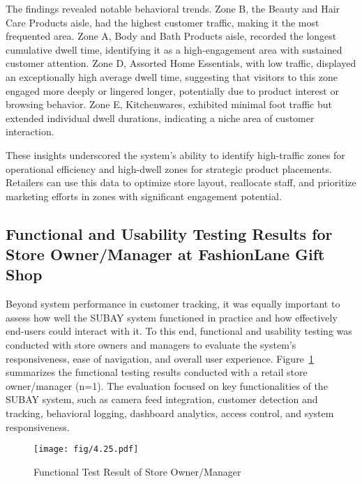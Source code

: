 {{\begin{longtable}{|p{1.5cm}|p{1.5cm}|c|p{1.5cm}|p{1.5cm}|p{1.5cm}|p{1.5cm}|}
	\end{longtable}
}


The findings revealed notable behavioral trends. Zone B, the Beauty and Hair Care Products aisle, had the highest customer traffic, making it the most frequented area. Zone A, Body and Bath Products aisle, recorded the longest cumulative dwell time, identifying it as a high-engagement area with sustained customer attention. Zone D, Assorted Home Essentials, with low traffic, displayed an exceptionally high average dwell time, suggesting that visitors to this zone engaged more deeply or lingered longer, potentially due to product interest or browsing behavior. Zone E, Kitchenwares, exhibited minimal foot traffic but extended individual dwell durations, indicating a niche area of customer interaction.

These insights underscored the system’s ability to identify high-traffic zones for operational efficiency and high-dwell zones for strategic product placements. Retailers can use this data to optimize store layout, reallocate staff, and prioritize marketing efforts in zones with significant engagement potential.

\subsection{Functional and Usability Testing Results for Store Owner/\newline Manager at FashionLane Gift Shop}

Beyond system performance in customer tracking, it was equally important to assess how well the SUBAY system functioned in practice and how effectively end-users could interact with it. To this end, functional and usability testing was conducted with store owners and managers to evaluate the system’s responsiveness, ease of navigation, and overall user experience. Figure~\ref{fig:4.25} summarizes the functional testing results conducted with a retail store owner/manager (n=1). The evaluation focused on key functionalities of the SUBAY system, such as camera feed integration, customer detection and tracking, behavioral logging, dashboard analytics, access control, and system responsiveness.

\begin{figure}[H]
	\caption[Functional Test Result of Store Owner/Manager]{\newline \newline Functional Test Result of Store Owner/Manager}
	\centering
	\texttt{[image: fig/4.25.pdf]}
	\label{fig:4.25}
\end{figure}

}
